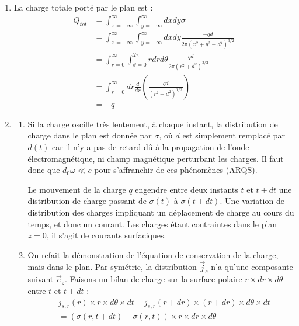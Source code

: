 \begin{correction}
\begin{enumerate}
	On trouve donc :
	\begin{align*}
		\sigma = \frac{-qd}{2\pi (x^2+y^2+d^2)^{3/2}}
	\end{align*}
	
	\item La charge totale porté par le plan est :
	\begin{align*}
		Q_{tot}&=\int_{x=-\infty}^{\infty}\int_{y=-\infty}^{\infty}dxdy\sigma \\
		&=\int_{x=-\infty}^{\infty}\int_{y=-\infty}^{\infty}dxdy\frac{-qd}{2\pi (x^2+y^2+d^2)^{3/2}}\\
		&=\int_{r=0}^{\infty}\int_{\theta=0}^{2\pi}rdrd\theta\frac{-qd}{2\pi (r^2+d^2)^{3/2}} \\
		&=\int_{r=0}^{\infty}dr\frac{d}{dr}\left( \frac{qd}{(r^2+d^2)^{1/2}}\right)  \\
		&=-q
	\end{align*}
	
	\item 
	
	\begin{enumerate}
	
		\item Si la charge oscille très lentement, à chaque instant, la distribution de charge dans le plan est donnée par $\sigma$, où $d$ est simplement remplacé par $d(t)$ car il n'y a pas de retard dû à la propagation de l'onde électromagnétique, ni champ magnétique perturbant les charges. Il faut donc que $d_0\omega \ll c$ pour s'affranchir de ces phénomènes (ARQS). 
		
		Le mouvement de la charge $q$ engendre entre deux instants $t$ et $t+dt$ une distribution de charge passant de $\sigma(t)$ à $\sigma(t+dt)$. Une variation de distribution des charges impliquant un déplacement de charge au cours du temps, et donc un courant. Les charges étant contraintes dans le plan $z=0$, il s'agit de courants surfaciques. 
		
		\item On refait la démonstration de l'équation de conservation de la charge, mais dans le plan. Par symétrie, la distribution $\vec{j}_s$ n'a qu'une composante suivant $\vec{e}_z$. Faisons un bilan de charge sur la surface polaire $r\times dr \times d\theta$ entre $t$ et $t+dt$ : 
		\begin{align*}
			&j_{s,r}(r)\times r \times d\theta\times dt-j_{s,r}(r+dr)\times (r+dr) \times d\theta\times dt \\
			&= (\sigma(r,t+dt)-\sigma(r,t))\times r\times dr \times d\theta
		\end{align*}
		

\end{enumerate}
\end{enumerate}
\end{correction}
